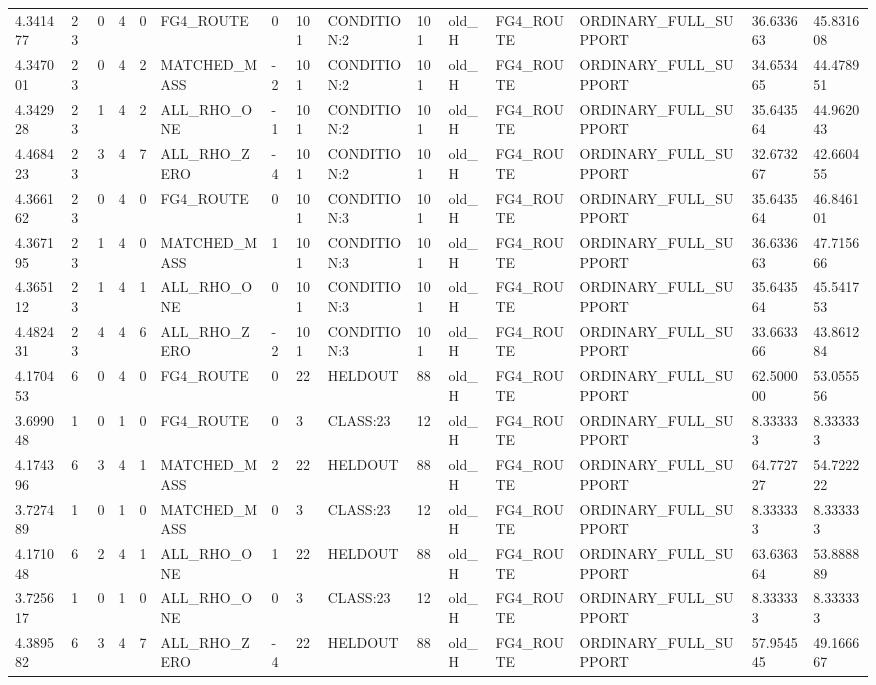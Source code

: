 \begin{tabular}{lllllllllllllll}
4.341477 & 23 & 0 & 4 & 0 & FG4\_ROUTE & 0 & 101 & CONDITION:2 & 101 & old\_H & FG4\_ROUTE & ORDINARY\_FULL\_SUPPORT & 36.633663 & 45.831608 \\
4.347001 & 23 & 0 & 4 & 2 & MATCHED\_MASS & -2 & 101 & CONDITION:2 & 101 & old\_H & FG4\_ROUTE & ORDINARY\_FULL\_SUPPORT & 34.653465 & 44.478951 \\
4.342928 & 23 & 1 & 4 & 2 & ALL\_RHO\_ONE & -1 & 101 & CONDITION:2 & 101 & old\_H & FG4\_ROUTE & ORDINARY\_FULL\_SUPPORT & 35.643564 & 44.962043 \\
4.468423 & 23 & 3 & 4 & 7 & ALL\_RHO\_ZERO & -4 & 101 & CONDITION:2 & 101 & old\_H & FG4\_ROUTE & ORDINARY\_FULL\_SUPPORT & 32.673267 & 42.660455 \\
4.366162 & 23 & 0 & 4 & 0 & FG4\_ROUTE & 0 & 101 & CONDITION:3 & 101 & old\_H & FG4\_ROUTE & ORDINARY\_FULL\_SUPPORT & 35.643564 & 46.846101 \\
4.367195 & 23 & 1 & 4 & 0 & MATCHED\_MASS & 1 & 101 & CONDITION:3 & 101 & old\_H & FG4\_ROUTE & ORDINARY\_FULL\_SUPPORT & 36.633663 & 47.715666 \\
4.365112 & 23 & 1 & 4 & 1 & ALL\_RHO\_ONE & 0 & 101 & CONDITION:3 & 101 & old\_H & FG4\_ROUTE & ORDINARY\_FULL\_SUPPORT & 35.643564 & 45.541753 \\
4.482431 & 23 & 4 & 4 & 6 & ALL\_RHO\_ZERO & -2 & 101 & CONDITION:3 & 101 & old\_H & FG4\_ROUTE & ORDINARY\_FULL\_SUPPORT & 33.663366 & 43.861284 \\
4.170453 & 6 & 0 & 4 & 0 & FG4\_ROUTE & 0 & 22 & HELDOUT & 88 & old\_H & FG4\_ROUTE & ORDINARY\_FULL\_SUPPORT & 62.500000 & 53.055556 \\
3.699048 & 1 & 0 & 1 & 0 & FG4\_ROUTE & 0 & 3 & CLASS:23 & 12 & old\_H & FG4\_ROUTE & ORDINARY\_FULL\_SUPPORT & 8.333333 & 8.333333 \\
4.174396 & 6 & 3 & 4 & 1 & MATCHED\_MASS & 2 & 22 & HELDOUT & 88 & old\_H & FG4\_ROUTE & ORDINARY\_FULL\_SUPPORT & 64.772727 & 54.722222 \\
3.727489 & 1 & 0 & 1 & 0 & MATCHED\_MASS & 0 & 3 & CLASS:23 & 12 & old\_H & FG4\_ROUTE & ORDINARY\_FULL\_SUPPORT & 8.333333 & 8.333333 \\
4.171048 & 6 & 2 & 4 & 1 & ALL\_RHO\_ONE & 1 & 22 & HELDOUT & 88 & old\_H & FG4\_ROUTE & ORDINARY\_FULL\_SUPPORT & 63.636364 & 53.888889 \\
3.725617 & 1 & 0 & 1 & 0 & ALL\_RHO\_ONE & 0 & 3 & CLASS:23 & 12 & old\_H & FG4\_ROUTE & ORDINARY\_FULL\_SUPPORT & 8.333333 & 8.333333 \\
4.389582 & 6 & 3 & 4 & 7 & ALL\_RHO\_ZERO & -4 & 22 & HELDOUT & 88 & old\_H & FG4\_ROUTE & ORDINARY\_FULL\_SUPPORT & 57.954545 & 49.166667 \\

\end{tabular}
